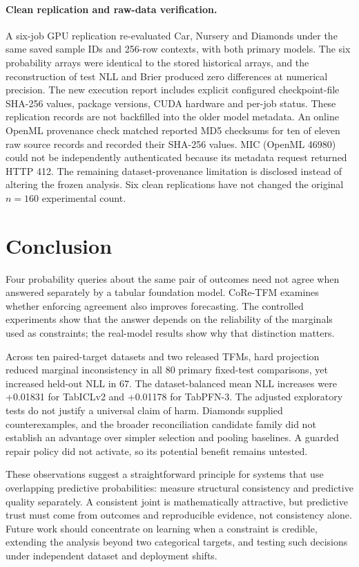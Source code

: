 \documentclass[a4paper,fleqn]{cas-sc}
\begin{document}
\paragraph{Clean replication and raw-data verification.}
A six-job GPU replication re-evaluated Car, Nursery and Diamonds under the same saved sample IDs and 256-row contexts, with both primary models. The six probability arrays were identical to the stored historical arrays, and the reconstruction of test NLL and Brier produced zero differences at numerical precision. The new execution report includes explicit configured checkpoint-file SHA-256 values, package versions, CUDA hardware and per-job status. These replication records are not backfilled into the older model metadata. An online OpenML provenance check matched reported MD5 checksums for ten of eleven raw source records and recorded their SHA-256 values. MIC (OpenML 46980) could not be independently authenticated because its metadata request returned HTTP 412. The remaining dataset-provenance limitation is disclosed instead of altering the frozen analysis. Six clean replications have not changed the original $n=160$ experimental count.

\section{Conclusion}
Four probability queries about the same pair of outcomes need not agree when answered separately by a tabular foundation model. CoRe-TFM examines whether enforcing agreement also improves forecasting. The controlled experiments show that the answer depends on the reliability of the marginals used as constraints; the real-model results show why that distinction matters.

Across ten paired-target datasets and two released TFMs, hard projection reduced marginal inconsistency in all 80 primary fixed-test comparisons, yet increased held-out NLL in 67. The dataset-balanced mean NLL increases were +0.01831 for TabICLv2 and +0.01178 for TabPFN-3. The adjusted exploratory tests do not justify a universal claim of harm. Diamonds supplied counterexamples, and the broader reconciliation candidate family did not establish an advantage over simpler selection and pooling baselines. A guarded repair policy did not activate, so its potential benefit remains untested.

These observations suggest a straightforward principle for systems that use overlapping predictive probabilities: measure structural consistency and predictive quality separately. A consistent joint is mathematically attractive, but predictive trust must come from outcomes and reproducible evidence, not consistency alone. Future work should concentrate on learning when a constraint is credible, extending the analysis beyond two categorical targets, and testing such decisions under independent dataset and deployment shifts.
\end{document}
